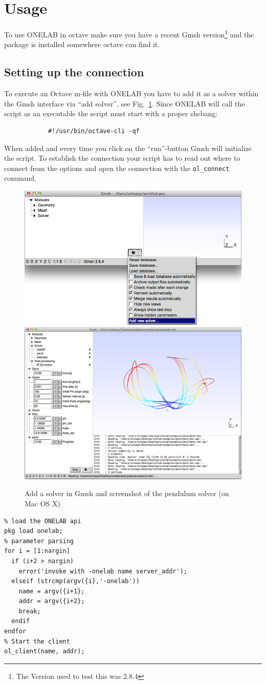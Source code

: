 \documentclass[article,english,colorback,accentcolor=tud9b,11pt]{tudreport}
\begin{document}
		\section{Usage}
		To use ONELAB in octave make sure you have a recent Gmsh version\footnote{The Version used to test this was 2.8.4} and the package is installed somewhere octave can find it.
		\subsection{Setting up the connection}
		To execute an Octave m-file with ONELAB you have to add it as a solver within the Gmsh interface via ``add solver'', see Fig.~\ref{fig:gmsh}. Since ONELAB will call the script as an executable the script must start with a proper shebang:
		\begin{lstlisting} 
			#!/usr/bin/octave-cli -qf
		\end{lstlisting}
		When added and every time you click on the ``run''-button Gmsh will initialize the script. To establish the connection your script has to read out where to connect from the options and open the connection with the \texttt{ol\_connect} command.
		\begin{figure}[b]
			\centering
			\includegraphics[width=.4\textwidth]{gmsh.png}
			\quad
			\includegraphics[width=.4\textwidth]{pend.png}        
			\caption{Add a solver in Gmsh and screenshot of the pendulum solver (on Mac OS X)}
			\label{fig:gmsh}
		\end{figure}
		\begin{lstlisting} 
% load the ONELAB api
pkg load onelab;
% parameter parsing
for i = [1:nargin]
  if (i+2 > nargin)
    error('invoke with -onelab name server_addr');
  elseif (strcmp(argv({i},'-onelab'))
    name = argv({i+1};
    addr = argv({i+2};
    break;
  endif
endfor
% Start the client
ol_client(name, addr);
		\end{lstlisting}
\end{document}
